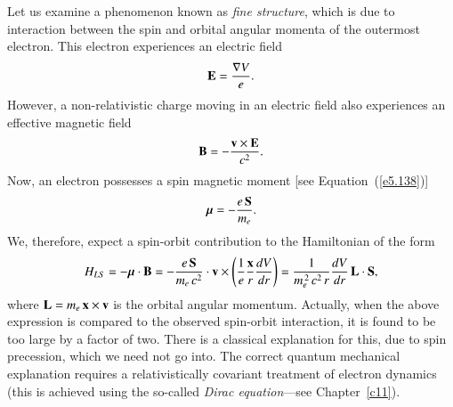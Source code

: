 Let us examine a phenomenon known as {\em fine structure}, which is due to
interaction between the spin and orbital angular momenta of the outermost 
electron. This electron experiences an electric field
\begin{equation}
{\bf E} = \frac{\nabla V}{e}.
\end{equation}
However, a non-relativistic charge moving in an electric field also experiences an effective
magnetic field
\begin{equation}
{\bf B} = - \frac{{\bf v} \times {\bf E}}{c^2}.
\end{equation}
Now, an electron possesses a spin magnetic moment [see Equation~(\ref{e5.138})]
\begin{equation}\label{e7.99d}
{\mbox{\boldmath$\mu$}} = - \frac{e\, {\bf S}}{m_e}.
\end{equation}
We, therefore, expect a spin-orbit contribution to the Hamiltonian of
the form
\begin{equation}
H_{LS} = - {\mbox{\boldmath$\mu$}}\cdot {\bf B} 
= - \frac{e \,{\bf S}}{m_e\,c^2} \cdot {\bf v} \times \left(\frac{1}{e} \frac{\bf x}{r}
\frac{d V}{dr}\right)
= \frac{1}{m_e^{\,2}\,c^2\,r}  \frac{d V}{dr}\, {\bf L}\cdot {\bf S},\label{e6.101}
\end{equation}
where ${\bf  L} = m_e \,{\bf  x}\times{\bf v}$ is the orbital angular momentum.
Actually, when the above expression is compared to the observed spin-orbit interaction,
it is found to be too large by a factor of two. There is a classical explanation
for this, due to spin precession, which we need not go into. The correct 
quantum mechanical explanation requires a relativistically covariant
treatment of electron dynamics (this is achieved  using the so-called {\em
Dirac equation}---see Chapter~\ref{c11}). 

